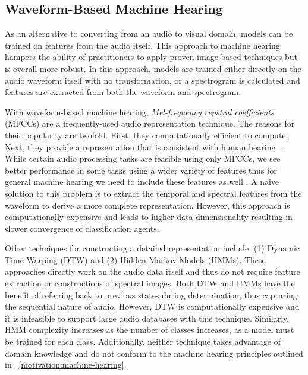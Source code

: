 \subsection{Waveform-Based Machine Hearing}

As an alternative to converting from an audio to visual domain, models can be trained on features from the audio itself. This approach to machine hearing hampers the ability of practitioners to apply proven image-based techniques but is overall more robust. In this approach, models are trained either directly on the audio waveform itself with no transformation, or a spectrogram is calculated and features are extracted from both the waveform and spectrogram.

With waveform-based machine hearing, \textit{Mel-frequency cepstral
coefficients} (MFCCs) are a frequently-used audio representation technique. 
The reasons for their popularity are twofold. First, they computationally
efficient to compute. Next, they provide a representation that is consistent
with human hearing~\cite{kaur-feature-2015}.
While certain audio processing tasks are feasible using only MFCCs, we see better performance
in some tasks using a wider variety of features thus for general machine hearing we need 
to include these features as well \cite{pichevar-auditory-inspired-2011}. 
A naive solution to this problem is to extract the temporal and spectral
features from the waveform to derive a more complete representation.
However, this approach is computationally expensive and leads to higher data
dimensionality resulting in slower convergence of classification agents.

Other techniques for constructing a detailed representation include: (1) 
Dynamic Time Warping (DTW) and (2) Hidden Markov Models (HMMs).
These approaches directly work on the audio data itself and thus do not require
feature extraction or constructions of spectral images.
Both DTW and HMMs have the benefit of referring back to previous states during determination, thus capturing the sequential nature of audio. 
However, DTW is computationally expensive and it is infeasible to support 
large audio databases with this technique.
Similarly, HMM complexity increases as the number of classes increases, 
as a model must be trained for each class.
Additionally, neither technique takes advantage of domain knowledge 
and do not conform to the machine hearing principles outlined
in ~\autoref{motivation:machine-hearing}.

